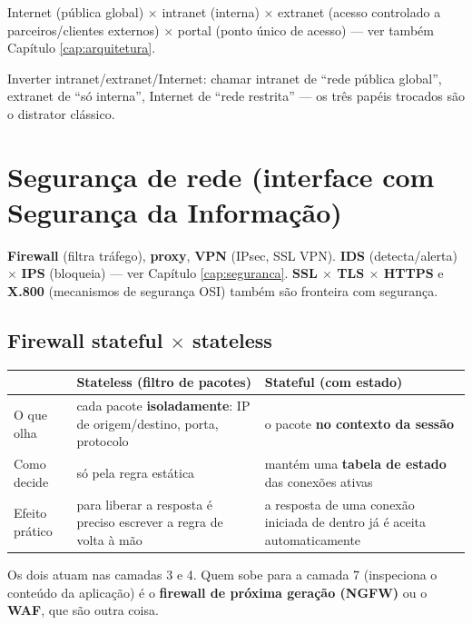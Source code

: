 Internet (pública global) $\times$ intranet (interna) $\times$ extranet
(acesso controlado a parceiros/clientes externos) $\times$ portal (ponto
único de acesso) --- ver também Capítulo \ref{cap:arquitetura}.

\begin{pegadinha}
Inverter intranet/extranet/Internet: chamar intranet de ``rede pública
global'', extranet de ``só interna'', Internet de ``rede restrita'' --- os
três papéis trocados são o distrator clássico.
\end{pegadinha}

\section{Segurança de rede (interface com Segurança da Informação)}

\textbf{Firewall} (filtra tráfego), \textbf{proxy}, \textbf{VPN} (IPsec, SSL
VPN). \textbf{IDS} (detecta/alerta) $\times$ \textbf{IPS} (bloqueia) --- ver
Capítulo \ref{cap:seguranca}. \textbf{SSL $\times$ TLS $\times$ HTTPS} e
\textbf{X.800} (mecanismos de segurança OSI) também são fronteira com
segurança.

\subsection{Firewall stateful $\times$ stateless}

\begin{center}
\begin{tabular}{@{}p{2.4cm}p{4.6cm}p{4.6cm}@{}}
\toprule
& \textbf{Stateless} (filtro de pacotes) & \textbf{Stateful} (com estado) \\
\midrule
O que olha & cada pacote \textbf{isoladamente}: IP de origem/destino, porta,
protocolo & o pacote \textbf{no contexto da sessão} \\
Como decide & só pela regra estática & mantém uma \textbf{tabela de estado}
das conexões ativas \\
Efeito prático & para liberar a resposta é preciso escrever a regra de volta
à mão & a resposta de uma conexão iniciada de dentro já é aceita
automaticamente \\
\bottomrule
\end{tabular}
\end{center}

Os dois atuam nas camadas 3 e 4. Quem sobe para a camada 7 (inspeciona o
conteúdo da aplicação) é o \textbf{firewall de próxima geração (NGFW)} ou o
\textbf{WAF}, que são outra coisa.

